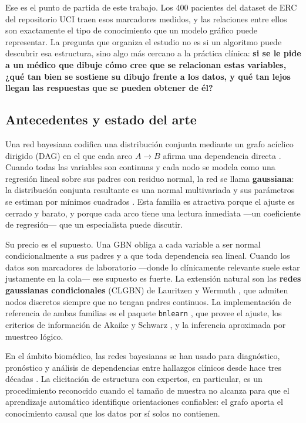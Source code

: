 \documentclass[11pt, a4paper]{article}
\begin{document}
Ese es el punto de partida de este trabajo. Los 400 pacientes del dataset de ERC del repositorio
UCI \cite{ckd2015} traen esos marcadores medidos, y las relaciones entre ellos son exactamente el
tipo de conocimiento que un modelo gráfico puede representar. La pregunta que organiza el estudio
no es si un algoritmo puede descubrir esa estructura, sino algo más cercano a la práctica clínica:
\textbf{si se le pide a un médico que dibuje cómo cree que se relacionan estas variables, ¿qué tan
bien se sostiene su dibujo frente a los datos, y qué tan lejos llegan las respuestas que se pueden
obtener de él?}

\subsection{Antecedentes y estado del arte}

Una red bayesiana codifica una distribución conjunta mediante un grafo acíclico dirigido (DAG) en
el que cada arco $A \rightarrow B$ afirma una dependencia directa \cite{pearl1988,koller2009}.
Cuando todas las variables son continuas y cada nodo se modela como una regresión lineal sobre sus
padres con residuo normal, la red se llama \textbf{gaussiana}: la distribución conjunta resultante
es una normal multivariada y sus parámetros se estiman por mínimos cuadrados
\cite{shachter1989,geiger1994}. Esta familia es atractiva porque el ajuste es cerrado y barato, y
porque cada arco tiene una lectura inmediata —un coeficiente de regresión— que un especialista
puede discutir.

Su precio es el supuesto. Una GBN obliga a cada variable a ser normal condicionalmente a sus
padres y a que toda dependencia sea lineal. Cuando los datos son marcadores de laboratorio —donde
lo clínicamente relevante suele estar justamente en la cola— ese supuesto es fuerte. La extensión
natural son las \textbf{redes gaussianas condicionales} (CLGBN) de Lauritzen y Wermuth
\cite{lauritzen1989,lauritzen1992}, que admiten nodos discretos siempre que no tengan padres
continuos. La implementación de referencia de ambas familias es el paquete \texttt{bnlearn}
\cite{scutari2010}, que provee el ajuste, los criterios de información de Akaike \cite{akaike1974}
y Schwarz \cite{schwarz1978}, y la inferencia aproximada por muestreo lógico.

En el ámbito biomédico, las redes bayesianas se han usado para diagnóstico, pronóstico y análisis
de dependencias entre hallazgos clínicos desde hace tres décadas \cite{lucas2004,kononenko2001}.
La elicitación de estructura con expertos, en particular, es un procedimiento reconocido cuando el
tamaño de muestra no alcanza para que el aprendizaje automático identifique orientaciones
confiables: el grafo aporta el conocimiento causal que los datos por sí solos no contienen.
\end{document}
